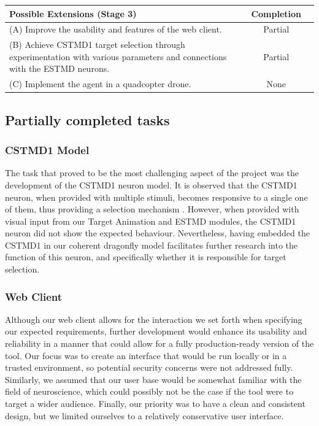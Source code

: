 \documentclass[a4paper,11pt]{article}
\begin{document}
\begin{center}
    \begin{tabular}{p{12cm} c c}
    \textbf{Possible Extensions (Stage 3)} & \textbf{Completion} \\ \hline
	(A) Improve the usability and features of the web client. & Partial\\
	(B) Achieve CSTMD1 target selection through experimentation with various parameters and connections with the ESTMD neurons. & Partial\\
	(C) Implement the agent in a quadcopter drone. & None\\
    \end{tabular}
\end{center}

\subsection{Partially completed tasks}

\subsubsection{CSTMD1 Model}

The task that proved to be the most challenging aspect of the project was the development of the 
CSTMD1 neuron model. It is observed that the CSTMD1 neuron, when provided with multiple stimuli,
becomes responsive to a single one of them, thus providing a selection mechanism \cite{?}.
However, when provided with visual input from our Target Animation and ESTMD modules, the CSTMD1
neuron did not show the expected behaviour. Nevertheless, having embedded the CSTMD1 in our coherent
dragonfly model facilitates further research into the function of this neuron, and specifically whether it is
responsible for target selection.

\subsubsection{Web Client}

Although our web client allows for the interaction we set forth when specifying our expected requirements,
further development would enhance its usability and reliability in a manner that could allow for a fully
production-ready version of the tool. Our focus was to create an interface that would be run locally or in a
trusted environment, so potential security concerns were not addressed fully. Similarly, we assumed that
our user base would be somewhat familiar with the field of neuroscience, which could possibly not be the
case if the tool were to target a wider audience. Finally, our priority was to have a clean and consistent
design, but we limited ourselves to a relatively conservative user interface.
\end{document}
